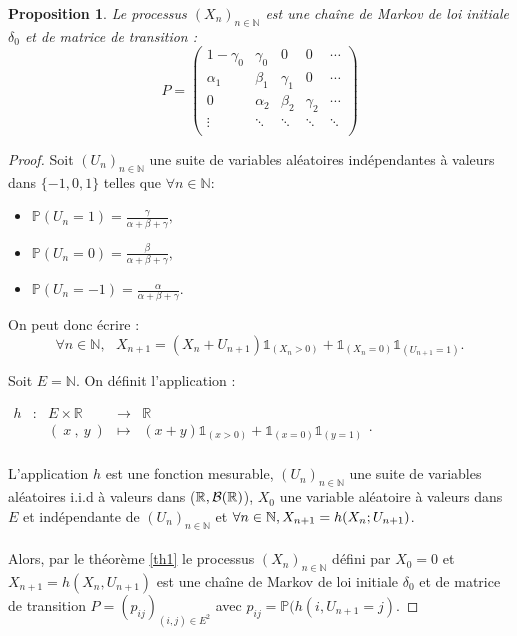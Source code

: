 \documentclass[12pt,a4paper]{report}
\newtheorem{prop}[thm]{Proposition}
\theoremstyle{remark}
\begin{document}
\begin{prop}\label{simple_markov}
Le processus $(X_n)_{n \in \mathbb{N}}$ est une chaîne de Markov de loi initiale $\delta_0$ et de matrice de transition :
$$P=
\begin{pmatrix}
        1-\gamma_0 & \gamma_0 & 0 & 0 & \cdots \\ 
         \alpha_1 & \beta_1 & \gamma_1 & 0 & \cdots\\
         0 & \alpha_2 & \beta_2 & \gamma_2 & \cdots\\
        \vdots &\ddots & \ddots & \ddots & \ddots \\ 
\end{pmatrix}$$
\end{prop}
\begin{proof}
Soit $(U_n)_{n\in \mathbb{N}}$ une suite de variables aléatoires indépendantes à valeurs dans $\{-1, 0, 1\}$ telles que $\forall n \in \mathbb{N}$: \\
\begin{itemize}
    \item $\mathbb{P}(U_n=1)= \frac{\gamma}{\alpha+\beta+\gamma},$
    \item $\mathbb{P}(U_n=0)= \frac{\beta}{\alpha+\beta+\gamma},$
    \item $\mathbb{P}(U_n=-1)= \frac{\alpha}{\alpha+\beta+\gamma}.$
\end{itemize}

\vspace{0.7cm}
On peut donc écrire : 
$$\forall n \in \mathbb{N}, \ \ \ X_{n+1} = (X_n + U_{n+1}) \mathds{1}_{(X_n >0)} + \mathds{1}_{(X_n=0)}\mathds{1}_{(U_{n+1}=1)}.$$

Soit $E=\mathbb{N}$. On définit l'application  : 
\begin{center}
$\begin{array}{ccccc}
h & : & E \times \mathbb{R} & \longrightarrow & \mathbb{R} \\
 & & (\ x \ ,\ y\ ) & \mapsto & (x + y) \mathds{1}_{(x >0)} + \mathds{1}_{(x=0)}\mathds{1}_{(y=1)}\\
\end{array}.$
\end{center}
 
\vspace{0.3cm}
L'application $h$ est une fonction mesurable, $(U_n)_{n\in\mathbb{N}}$ une suite de variables aléatoires i.i.d à valeurs dans ($\mathbb{R},\cal{B}(\mathbb{R})$), $X_0$ une variable aléatoire à valeurs dans $E$ et indépendante de $(U_n)_{n\in \mathbb{N}}$ et $\forall n \in \mathbb{N}, \ \\X_{n+1}=h(X_n;U_{n+1})$.
\\
\\
Alors, par le théorème \ref{th1} le processus $(X_n)_{n\in\mathbb{N}}$ défini par $X_0 = 0$ et $X_{n+1}=h(X_n,U_{n+1})$ est une chaîne de Markov de loi initiale $\delta_0$ et de matrice de transition $P = (p_{ij})_{(i,j) \in E^2}$ avec $p_{ij} = \mathbb{P}(h(i, U_{n+1} = j)$. 
\end{proof}
\vspace{0.5cm}
\end{document}
